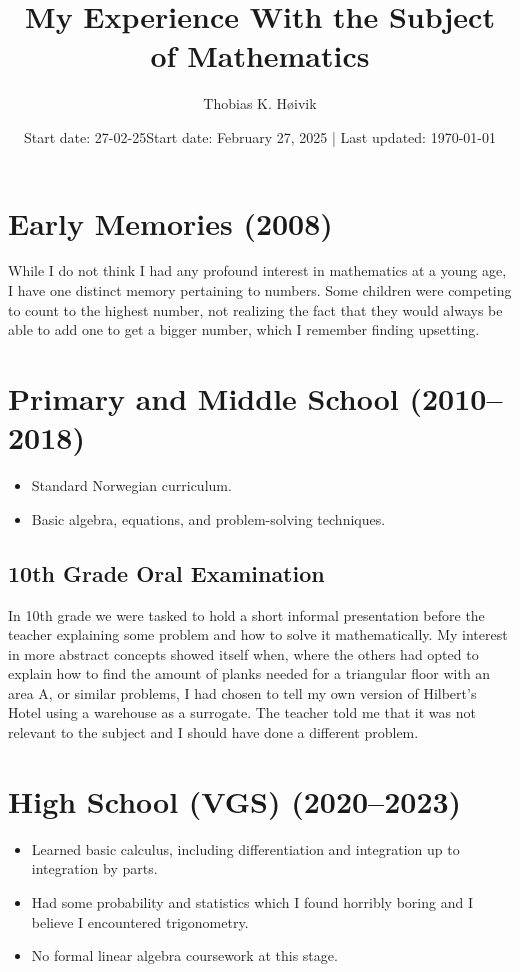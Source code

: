 \documentclass{article}
\title{My Experience With the Subject of Mathematics}
\author{Thobias K. Høivik}
\date{Start date: 27-02-25}
\date{Start date: February 27, 2025 | Last updated: \today}
\begin{document}
\maketitle

\section{Early Memories (2008)}
While I do not think I had any profound interest in mathematics 
at a young age, I have one distinct memory pertaining to numbers. 
Some children were competing to count to the highest number,
not realizing the fact that they would always be able to add one to 
get a bigger number, which I remember finding upsetting.

\section{Primary and Middle School (2010--2018)}
\begin{itemize}
    \item Standard Norwegian curriculum.
    \item Basic algebra, equations, and problem-solving techniques.
\end{itemize}
\subsection*{10th Grade Oral Examination}
In 10th grade we were tasked to hold a short informal presentation before the teacher explaining some problem and how to solve it mathematically. 
My interest in more abstract concepts showed itself when, where the others had opted to explain how to find the amount of planks needed for a triangular floor with an area A, or similar problems, I had chosen to tell my own version of Hilbert's Hotel using a warehouse as a surrogate.
The teacher told me that it was not relevant to the subject and I should have done a different problem.

\break
\section{High School (VGS) (2020--2023)}
\begin{itemize}
    \item Learned basic calculus, including differentiation and integration up to integration by parts.
    \item Had some probability and statistics which I found horribly boring and I believe I encountered trigonometry.
    \item No formal linear algebra coursework at this stage.
\end{itemize}
\end{document}
